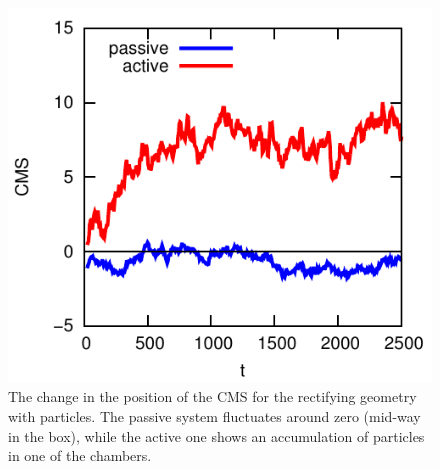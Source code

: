 \documentclass[aip,jcp,reprint,a4paper,onecolumn,amsmath]{revtex4-1}
\begin{document}
\begin{figure}[!htb]
\begin{center}
\includegraphics[scale=1.0]{FIGURES/rectification}
\end{center}
\caption{\label{fig:rectification}The change in the position of the CMS for the
rectifying geometry with particles. The passive system fluctuates around zero
(mid-way in the box), while the active one shows an accumulation of particles
in one of the chambers.}
\end{figure}
\end{document}
